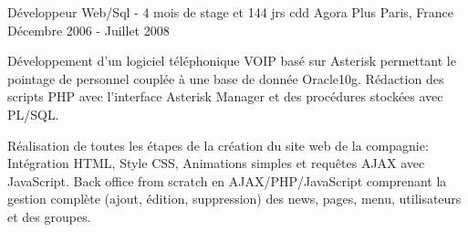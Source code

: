 \cventry
{Développeur Web/Sql - 4 mois de stage et 144 jrs cdd} %
{Agora Plus} %
{Paris, France} %
{Décembre 2006 - Juillet 2008} %
{
\begin{cvitems} %
    \item
    {
        Développement d’un logiciel téléphonique VOIP basé sur Asterisk
        permettant le pointage de personnel couplée à une base de donnée Oracle10g.
        Rédaction des scripts PHP avec l'interface Asterisk Manager et des procédures stockées avec PL/SQL.
    }
    \item
    {
        Réalisation de toutes les étapes de la création du site web de la compagnie:
        Intégration HTML, Style CSS, Animations simples et requêtes AJAX avec JavaScript.
        Back office from scratch en AJAX/PHP/JavaScript comprenant la gestion complète (ajout,
        édition, suppression) des news, pages, menu, utilisateurs et des groupes.
    }
\end{cvitems}
}